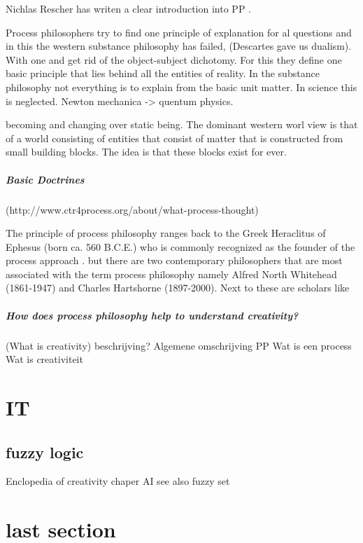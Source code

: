 \documentclass[a4paper]{Thesis}
\begin{document}
Nichlas Rescher has writen a clear introduction into PP \cite{rescher1996process}.

Process philosophers try to find one principle of explanation for al questions and in this the western  substance philosophy has failed, (Descartes gave us dualism).
With one and get rid of the object-subject dichotomy. For this they define one basic principle that lies behind all the entities of reality. 
In the substance philosophy not everything is to explain from the basic unit matter. In science this is neglected.
Newton mechanica -> quentum physics.

becoming and changing over static being. The dominant western worl view is that of a world consisting of entities that consist of matter that is constructed from small building blocks. The idea is that these blocks exist for ever.

\paragraph{Basic Doctrines}

(http://www.ctr4process.org/about/what-process-thought)

The principle of process philosophy ranges back to the Greek Heraclitus of Ephesus (born ca. 560 B.C.E.) who is commonly recognized as the founder of the process approach \cite{Seibt-2013-sep}. 
but there are two contemporary philosophers that are most associated with the term process philosophy namely Alfred North Whitehead (1861-1947) and Charles Hartshorne (1897-2000).
Next to these are scholars like


\paragraph{How does process philosophy help to understand creativity?}


\paragragph(What is creativity)
beschrijving?
Algemene omschrijving PP
Wat is een process
Wat is creativiteit


\chapter{IT}

\section{fuzzy logic}
Enclopedia of creativity chaper AI
see also fuzzy set


\chapter{last section}
\end{document}
